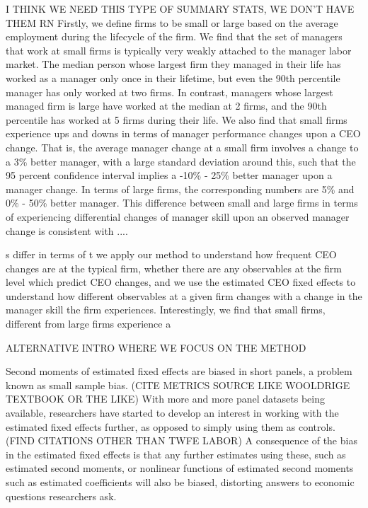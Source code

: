 \documentclass[11pt,a4paper]{article}
\begin{document}
I THINK WE NEED THIS TYPE OF SUMMARY STATS, WE DON'T HAVE THEM RN
Firstly, we define firms to be small or large based on the average employment during the lifecycle of the firm. We find that the set of managers that work at small firms is typically very weakly attached to the manager labor market. The median person whose largest firm they managed in their life has worked as a manager only once in their lifetime, but even the 90th percentile manager has only worked at two firms. In contrast, managers whose largest managed firm is large have worked at the median at 2 firms, and the 90th percentile has worked at 5 firms during their life. We also find that small firms experience ups and downs in terms of manager performance changes upon a CEO change. That is, the average manager change at a small firm involves a change to a 3\% better manager, with a large standard deviation around this, such that the 95 percent confidence interval implies a -10\% - 25\% better manager upon a manager change. In terms of large firms, the corresponding numbers are 5\% and 0\% - 50\% better manager. This difference between small and large firms in terms of experiencing differential changes of manager skill upon an observed manager change is consistent with ....





s differ in terms of t we apply our method to understand how frequent CEO changes are at the typical firm, whether there are any observables at the firm level which predict CEO changes, and we use the estimated CEO fixed effects to understand how different observables at a given firm changes with a change in the manager skill the firm experiences. Interestingly, we find that small firms, different from large firms experience a

ALTERNATIVE INTRO WHERE WE FOCUS ON THE METHOD

Second moments of estimated fixed effects are biased in short panels, a problem known as small sample bias. (CITE METRICS SOURCE LIKE WOOLDRIGE TEXTBOOK OR THE LIKE) With more and more panel datasets being available, researchers have started to develop an interest in working with the estimated fixed effects further, as opposed to simply using them as controls. (FIND CITATIONS OTHER THAN TWFE LABOR) A consequence of the bias in the estimated fixed effects is that any further estimates using these, such as estimated second moments, or nonlinear functions of estimated second moments such as estimated coefficients will also be biased, distorting answers to economic questions researchers ask.
\end{document}
